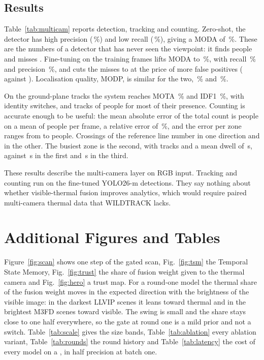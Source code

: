 \subsection{Results}
Table~\ref{tab:multicam} reports detection, tracking and counting. Zero-shot, the detector has high precision (\camDetZeroShotPrecision{}\,\%) and low recall (\camDetZeroShotRecall{}\,\%), giving a MODA of \camDetZeroShotModa{}\,\%. These are the numbers of a detector that has never seen the viewpoint: it finds \camDetZeroShotTp{} people and misses \camDetZeroShotFn{}. Fine-tuning on the training frames lifts MODA to \camDetFineTunedModa{}\,\%, with recall \camDetFineTunedRecall{}\,\% and precision \camDetFineTunedPrecision{}\,\%, and cuts the misses to \camDetFineTunedFn{} at the price of more false positives (\camDetFineTunedFp{} against \camDetZeroShotFp{}). Localisation quality, MODP, is similar for the two, \camDetZeroShotModp{}\,\% and \camDetFineTunedModp{}\,\%.

On the ground-plane tracks the system reaches MOTA \camTrackMota{}\,\% and IDF1 \camTrackIdfOne{}\,\%, with \camTrackSwitches{} identity switches, and tracks \camTrackMostlyTracked{} of \camTrackUniqueObjects{} people for most of their presence. Counting is accurate enough to be useful: the mean absolute error of the total count is \camCountMae{} people on a mean of \camCountMeanPeople{} people per frame, a relative error of \camCountRelErr{}\,\%, and the error per zone ranges from \camCountZoneThreeMae{} to \camCountZoneTwoMae{} people. Crossings of the reference line number \camCrossBackward{} in one direction and \camCrossForward{} in the other. The busiest zone is the second, with \camDwellZoneTwoTracks{} tracks and a mean dwell of \camDwellZoneTwoMeanS{}\,s, against \camDwellZoneOneMeanS{}\,s in the first and \camDwellZoneThreeMeanS{}\,s in the third.

These results describe the multi-camera layer on RGB input. Tracking and counting run on the fine-tuned YOLO26-m detections. They say nothing about whether visible-thermal fusion improves analytics, which would require paired multi-camera thermal data that WILDTRACK lacks.



\section{Additional Figures and Tables}
\label{sec:extra}
Figure~\ref{fig:scan} shows one step of the gated scan, Fig.~\ref{fig:tsm} the Temporal State Memory, Fig.~\ref{fig:trust} the share of fusion weight given to the thermal camera and Fig.~\ref{fig:hero} a trust map. For a round-one model the thermal share of the fusion weight moves in the expected direction with the brightness of the visible image: in the darkest LLVIP scenes it leans toward thermal and in the brightest M3FD scenes toward visible. The swing is small and the share stays close to one half everywhere, so the gate at round one is a mild prior and not a switch. Table~\ref{tab:scale} gives the size bands, Table~\ref{tab:ablation} every ablation variant, Table~\ref{tab:rounds} the round history and Table~\ref{tab:latency} the cost of every model on a \latLocalDevice{}, in half precision at batch one.

